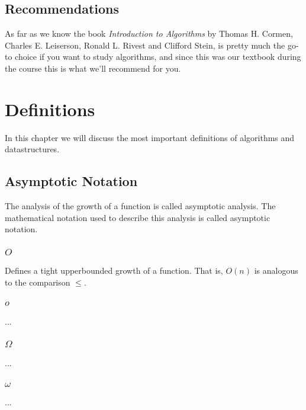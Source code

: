 \documentclass[11pt,english]{book}
\begin{document}
\section*{Recommendations}
As far as we know the book \textit{Introduction to Algorithms} by Thomas H.
Cormen, Charles E. Leiserson, Ronald L. Rivest and Clifford Stein, is pretty
much the go-to choice if you want to study algorithms, and since this was our
textbook during the course this is what we'll recommend for you.



\thispagestyle{fancyplain}

\chapter{Definitions}
\label{ch:definitions}
In this chapter we will discuss the most important definitions of algorithms
and datastructures.

\section{Asymptotic Notation}
\label{ch:definitions|sec:asymptotic-notation}
The analysis of the growth of a function is called asymptotic analysis. The
mathematical notation used to describe this analysis is called asymptotic
notation.

\subsection{$O$}
\label{ch:definitions|sec:asymptotic-notation|sub:big-o}
Defines a tight upperbounded growth of a function. That is, $O(n)$ is
analogous to the comparison $\leq$.

\subsection{$o$}
\label{ch:definitions|sec:asymptotic-notation|sub:little-o}
...

\subsection{$\Omega$}
\label{ch:definitions|sec:asymptotic-notation|sub:big-omega}
...

\subsection{$\omega$}
\label{ch:definitions|sec:asymptotic-notation|sub:litte-omega}
...
\end{document}
